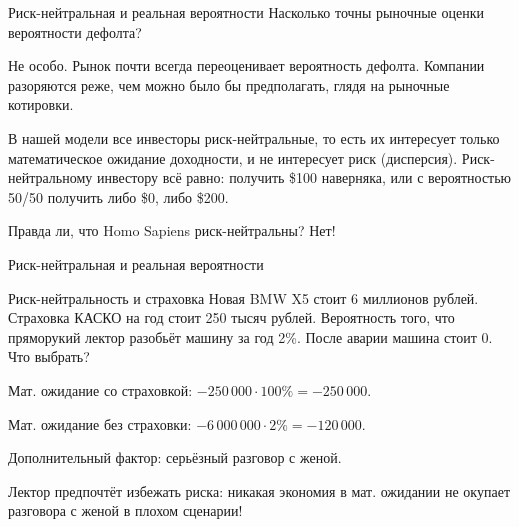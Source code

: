 \documentclass{beamer}
\begin{document}
\begin{frame}{Риск-нейтральная и реальная вероятности}
\justify
Насколько точны рыночные оценки вероятности дефолта?

\vspace{\baselineskip}
Не особо. Рынок почти всегда \alert{переоценивает} вероятность дефолта. Компании разоряются \alert{реже}, чем можно было бы предполагать, глядя на рыночные котировки.

\vspace{\baselineskip}
В нашей модели все инвесторы риск-нейтральные, то есть их интересует только математическое ожидание доходности, и не интересует риск (дисперсия). Риск-нейтральному инвестору всё равно: получить \$100 наверняка, или с вероятностью 50/50 получить либо \$0, либо \$200.

\vspace{\baselineskip}
Правда ли, что Homo Sapiens риск-нейтральны? Нет!
\end{frame}



\begin{frame}{Риск-нейтральная и реальная вероятности}
\centering
{}
\end{frame}



\begin{frame}{Риск-нейтральность и страховка}
\justify
Новая BMW X5 стоит 6 миллионов рублей. Страховка КАСКО на год стоит 250 тысяч рублей. Вероятность того, что пряморукий лектор разобьёт машину за год 2\%. После аварии машина стоит 0. Что выбрать?

\justify
Мат. ожидание со страховкой: $-250\,000 \cdot 100\% = -250\,000$.

\justify
Мат. ожидание без страховки: $-6\,000\,000 \cdot 2\% = -120\,000$.

Дополнительный фактор: серьёзный разговор с женой.

\justify
Лектор предпочтёт избежать риска: никакая экономия в мат. ожидании не окупает
разговора с женой в плохом сценарии!
\end{frame}
\end{document}
